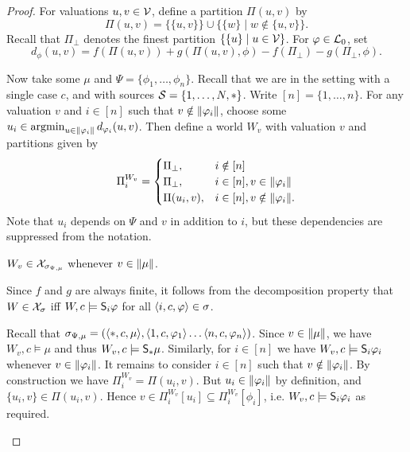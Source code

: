 \begin{proof}
    For valuations $u, v \in \vals$, define a partition $\Pi(u, v)$ by
    \[
        \Pi(u, v) = \{\{u, v\}\} \cup \{\{w\} \mid w \notin \{u, v\}\}.
    \]
    Recall that $\Pi_\bot$ denotes the finest partition $\{\{u\} \mid u \in
    \vals\}$. For $\phi \in \lprop$, set
    \[
        d_\phi(u, v)
        = f(\Pi(u, v)) + g(\Pi(u, v), \phi) - f(\Pi_\bot) - g(\Pi_\bot, \phi).
    \]

    Now take some $\mu$ and $\Psi = \{\phi_1, \ldots, \phi_n\}$. Recall that we
    are in the setting with a single case $c$, and with sources $\srcs = \{1,
    \ldots, N, \ast\}$. Write $[n] = \{1, \ldots, n\}$. For any valuation $v$
    and $i \in [n]$ such that $v \notin \propmods{\phi_i}$, choose some $u_i
    \in \argmin_{u \in \propmods{\phi_i}}{d_{\phi_i}(u, v)}$.  Then define a
    world $W_v$ with valuation $v$ and partitions given by
    \[
        \Pi^{W_v}_i = \begin{cases}
            \Pi_\bot,& i \notin [n] \\
            \Pi_\bot,& i \in [n], v \in \propmods{\phi_i} \\
            \Pi(u_i, v),& i \in [n], v \notin \propmods{\phi_i}.
        \end{cases}
    \]
    Note that $u_i$ depends on $\Psi$ and $v$ in addition to $i$, but these
    dependencies are suppressed from the notation.

    \begin{claim}
        \label{kr_app_claim_wv_sound}
        $W_v \in \X_{\sigma_{\Psi, \mu}}$ whenever $v \in \propmods{\mu}$.
    \end{claim}
    \begin{claimproof}
        Since $f$ and $g$ are always finite, it follows from the
        decomposition property that $W \in \X_\sigma$ iff $W, c \models
        \S_i\phi$ for all $\tuple{i, c, \phi} \in \sigma$.

        Recall that $\sigma_{\Psi, \mu} = (\tuple{\ast, c, \mu}, \tuple{1, c,
        \phi_1} \ldots \tuple{n, c, \phi_n})$. Since $v \in \propmods{\mu}$, we
        have $W_v, c \models \mu$ and thus $W_v, c \models \S_\ast\mu$.
        Similarly, for $i \in [n]$ we have $W_v, c \models \S_i\phi_i$ whenever
        $v \in \propmods{\phi_i}$. It remains to consider $i \in [n]$ such that
        $v \notin \propmods{\phi_i}$. By construction we have $\Pi^{W_v}_i =
        \Pi(u_i, v)$. But $u_i \in \propmods{\phi_i}$ by definition, and
        $\{u_i, v\} \in \Pi(u_i, v)$. Hence $v \in \Pi^{W_v}_i[u_i] \subseteq
        \Pi^{W_v}_i[\phi_i]$, i.e. $W_v, c \models \S_i\phi_i$ as required.
    \end{claimproof}


\end{proof}
